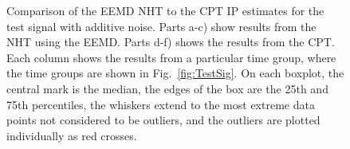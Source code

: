 \documentclass[11pt,draftcls,onecolumn]{IEEEtran}
\begin{document}
\begin{figure}[ht]
		\caption{Comparison of the EEMD NHT to the CPT IP estimates for the test signal with additive noise. Parts a-c) show results from the NHT using the EEMD. Parts d-f) shows the results from the CPT. Each column shows the results from a particular time group, where the time groups are shown in Fig.~\ref{fig:TestSig}. On each boxplot, the central mark is the median, the edges of the box are the 25th and 75th percentiles, the whiskers extend to the most extreme data points not considered to be outliers, and the outliers are plotted individually as red crosses.}
		\label{fig:RMSEComparison}
\end{figure}
\end{document}
